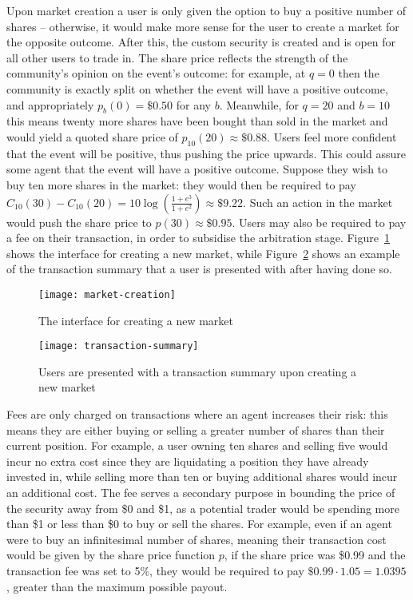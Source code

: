 Upon market creation a user is only given the option to buy a positive number
of shares -- otherwise, it would make more sense for the user to create a
market for the opposite outcome. After this, the custom security is created and
is open for all other users to trade in. The share price reflects the strength
of the community's opinion on the event's outcome: for example, at $q=0$ then
the community is exactly split on whether the event will have a positive
outcome, and appropriately $p_b(0)=\$0.50$ for any $b$. Meanwhile, for $q=20$
and $b=10$ this means twenty more shares have been bought than sold in the
market and would yield a quoted share price of $p_{10}(20) \approx \$0.88$.
Users feel more confident that the event will be positive, thus pushing the
price upwards. This could assure some agent that the event will have a positive
outcome. Suppose they wish to buy ten more shares in the market: they would
then be required to pay $C_{10}(30)-C_{10}(20)=10 \log (\frac{1+e^3}{1+e^2})
\approx \$9.22$. Such an action in the market would push the share price to
$p(30) \approx \$0.95$. Users may also be required to pay a fee on their
transaction, in order to subsidise the arbitration stage.
Figure~\ref{fig:marketCreation} shows the interface for creating a new market,
while Figure~\ref{fig:transactionSummary} shows an example of the transaction
summary that a user is presented with after having done so.

\begin{figure}[h]
	\centering
	\texttt{[image: market-creation]}
	\caption{The interface for creating a new market}
	\label{fig:marketCreation}
\end{figure}

\begin{figure}[h]
	\centering
	\texttt{[image: transaction-summary]}
	\caption{Users are presented with a transaction summary upon creating a new
	market}
	\label{fig:transactionSummary}
\end{figure}

Fees are only charged on transactions where an agent increases their risk: this
means they are either buying or selling a greater number of shares than their
current position. For example, a user owning ten shares and selling five would
incur no extra cost since they are liquidating a position they have already
invested in, while selling more than ten or buying additional shares would
incur an additional cost. The fee serves a secondary purpose in bounding the
price of the security away from \$0 and \$1, as a potential trader would be
spending more than \$1 or less than \$0 to buy or sell the shares. For example,
even if an agent were to buy an infinitesimal number of shares, meaning their
transaction cost would be given by the share price function $p$, if the share
price was \$0.99 and the transaction fee was set to 5\%, they would be required
to pay $\$0.99 \cdot 1.05 = 1.0395$, greater than the maximum possible payout.

